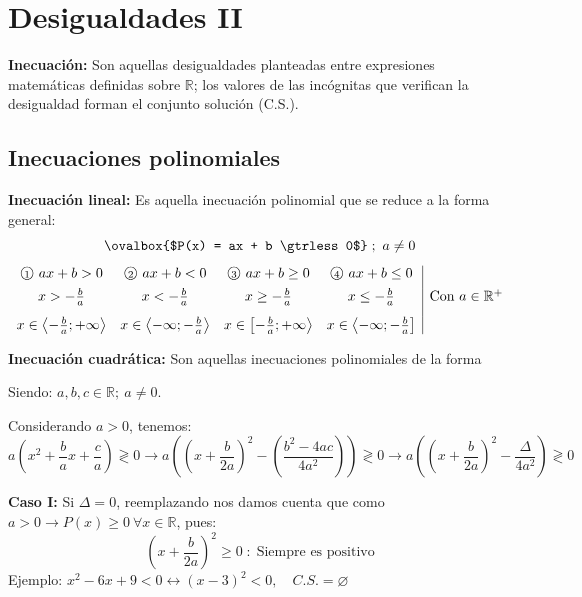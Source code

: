 \documentclass[11pt,a4paper]{article}
\newcommand{\cn}[1]{\raisebox{.5pt}{\textcircled{\raisebox{-.9pt}{\scriptsize #1}}}}
\begin{document}
\newpage
\section{Desigualdades II}

\textbf{Inecuación:} Son aquellas desigualdades planteadas entre expresiones matemáticas
definidas sobre $\mathbb{R}$; los valores de las incógnitas que verifican la desigualdad
forman el conjunto solución (C.S.).

\subsection*{Inecuaciones polinomiales}

\textcolor{verde}{\textbf{Inecuación lineal:}} Es aquella inecuación polinomial que se reduce
a la forma general:
\[\ovalbox{$P(x) = ax + b \gtrless 0$}\;;\ a \neq 0\]
{\small\[
\begin{array}{cccc|l}
\cn{1}\ ax + b > 0 & \cn{2}\ ax + b < 0 & \cn{3}\ ax + b \geq 0 & \cn{4}\ ax + b \leq 0 & \\[4pt]
x > -\frac{b}{a} & x < -\frac{b}{a} & x \geq -\frac{b}{a} & x \leq -\frac{b}{a} & \text{Con } a \in \mathbb{R}^+\\[8pt]
x \in \left\langle -\frac{b}{a}; +\infty\right\rangle &
x \in \left\langle -\infty; -\frac{b}{a}\right\rangle &
x \in \left[-\frac{b}{a}; +\infty\right\rangle &
x \in \left\langle -\infty; -\frac{b}{a}\right] &
\end{array}
\]}

\textcolor{verde}{\textbf{Inecuación cuadrática:}} Son aquellas inecuaciones polinomiales de
la forma \ 

Siendo: $a, b, c \in \mathbb{R};\ a \neq 0$.

Considerando $a > 0$, tenemos:
\[
a\left(x^2 + \frac{b}{a}x + \frac{c}{a}\right) \gtrless 0
\longrightarrow
a\left(\left(x + \frac{b}{2a}\right)^2 - \left(\frac{b^2 - 4ac}{4a^2}\right)\right) \gtrless 0
\longrightarrow
a\left(\left(x + \frac{b}{2a}\right)^2 - \frac{\Delta}{4a^2}\right) \gtrless 0
\]

\textcolor{rojo}{\textbf{Caso I:}} Si $\Delta = 0$, reemplazando nos damos cuenta que como
$a > 0 \rightarrow P(x) \geq 0\ \forall x \in \mathbb{R}$, pues:
\[\left(x + \frac{b}{2a}\right)^2 \geq 0 \;:\; \text{Siempre es positivo}\]
Ejemplo: \quad $x^2 - 6x + 9 < 0 \leftrightarrow (x-3)^2 < 0, \quad C.S. = \varnothing$
\end{document}
